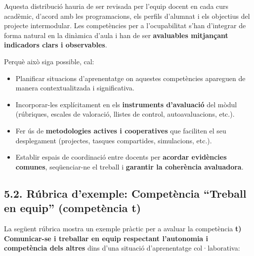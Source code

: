 \documentclass[
  paper=a4,
  ,captions=tableheading
]{scrartcl}
\providecommand{\tightlist}{%
  \setlength{\itemsep}{0pt}\setlength{\parskip}{0pt}}
\renewenvironment{quote}{\begin{customblockquote}\list{}{\rightmargin=0em\leftmargin=0em}%
\item\relax\color{blockquote-text}\ignorespaces}{\unskip\unskip\endlist\end{customblockquote}}
\begin{document}
\begin{quote}
Aquesta distribució hauria de ser revisada per l'equip docent en cada
curs acadèmic, d'acord amb les programacions, els perfils d'alumnat i
els objectius del projecte intermodular. Les competències per a
l'ocupabilitat s'han d'integrar de forma natural en la dinàmica d'aula i
han de ser \textbf{avaluables mitjançant indicadors clars i
observables}.
\end{quote}

Perquè això siga possible, cal:

\begin{itemize}
\tightlist
\item
  Planificar situacions d'aprenentatge on aquestes competències
  apareguen de manera contextualitzada i significativa.
\item
  Incorporar-les explícitament en els \textbf{instruments d'avaluació}
  del mòdul (rúbriques, escales de valoració, llistes de control,
  autoavaluacions, etc.).
\item
  Fer ús de \textbf{metodologies actives i cooperatives} que faciliten
  el seu desplegament (projectes, tasques compartides, simulacions,
  etc.).
\item
  Establir espais de coordinació entre docents per \textbf{acordar
  evidències comunes}, seqüenciar-ne el treball i \textbf{garantir la
  coherència avaluadora}.
\end{itemize}

\hypertarget{ruxfabrica-dexemple-competuxe8ncia-treball-en-equip-competuxe8ncia-t}{%
\subsection{5.2. Rúbrica d'exemple: Competència ``Treball en equip''
(competència
t)}\label{ruxfabrica-dexemple-competuxe8ncia-treball-en-equip-competuxe8ncia-t}}

La següent rúbrica mostra un exemple pràctic per a avaluar la
competència \textbf{t) Comunicar-se i treballar en equip respectant
l'autonomia i competència dels altres} dins d'una situació
d'aprenentatge col·laborativa:
\end{document}
